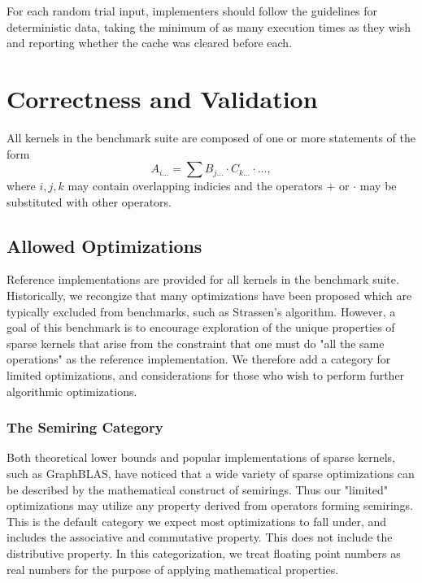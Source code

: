 \documentclass{article}
\begin{document}
    For each random trial input, implementers should follow the guidelines for deterministic data, taking the minimum of as many execution times as they wish and reporting whether the cache was cleared before each.

\section{Correctness and Validation}

    All kernels in the benchmark suite are composed of one or more statements of the form
    \begin{equation}\label{eq:einsum}
        A_{i...} = \sum B_{j...} \cdot C_{k...} \cdot ... ,
    \end{equation}
    where $i, j, k$ may contain overlapping indicies and the operators $+$ or $\cdot$ may be substituted with other operators.

    \subsection{Allowed Optimizations}
        Reference implementations are provided for all kernels in the benchmark suite. Historically, we recongize that many optimizations have been proposed which are typically excluded from benchmarks, such as Strassen's algorithm. However, a goal of this benchmark is to encourage exploration of the unique properties of sparse kernels that arise from the constraint that one must do "all the same operations" as the reference implementation. We therefore add a category for limited optimizations, and considerations for those who wish to perform further algorithmic optimizations.

    \subsubsection{The Semiring Category}
        Both theoretical lower bounds and popular implementations of sparse kernels, such as GraphBLAS, have noticed that a wide variety of sparse optimizations can be described by the mathematical construct of semirings. Thus our "limited" optimizations may utilize any property derived from operators forming semirings. This is the default category we expect most optimizations to fall under, and includes the associative and commutative property. This does not include the distributive property.  In this categorization, we treat floating point numbers as real numbers for the purpose of applying mathematical properties.
\end{document}
